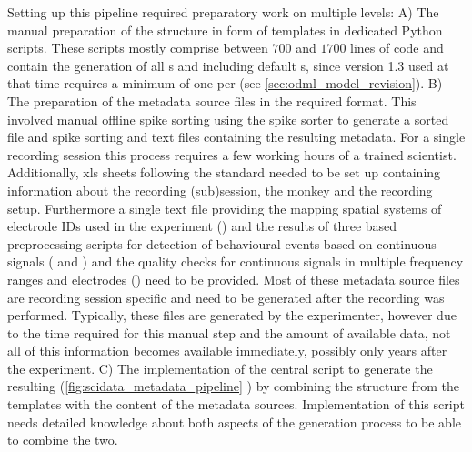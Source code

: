 Setting up this pipeline required preparatory work on multiple levels:
A) The manual preparation of the  structure in form of  templates in dedicated Python scripts. These scripts mostly comprise between $700$ and $1700$ lines of code and contain the generation of all  s and  including default s, since  version 1.3 used at that time requires a minimum of one  per  (see \cref{sec:odml_model_revision}). 
B) The preparation of the metadata source files in the required format. This involved manual offline spike sorting using the  spike sorter to generate a sorted  file and spike sorting  and text files containing the resulting metadata. For a single recording session this process requires a few working hours of a trained scientist. Additionally, xls sheets following the  standard needed to be set up containing information about the recording (sub)session, the monkey and the recording setup. Furthermore a single text file providing the mapping spatial systems of electrode IDs used in the experiment () and the results of three  based preprocessing scripts for detection of behavioural events based on continuous signals ( and ) and the quality checks for continuous signals in multiple frequency ranges and electrodes () need to be provided. Most of these metadata source files are recording session specific and need to be generated after the recording was performed. Typically, these files are generated by the experimenter, however due to the time required for this manual step and the amount of available data, not all of this information becomes available immediately, possibly only years after the experiment.
C) The implementation of the central script to generate the resulting   (\cref{fig:scidata_metadata_pipeline} ) by combining the  structure from the templates with the content of the metadata sources. Implementation of this script needs detailed knowledge about both aspects of the  generation process to be able to combine the two.

